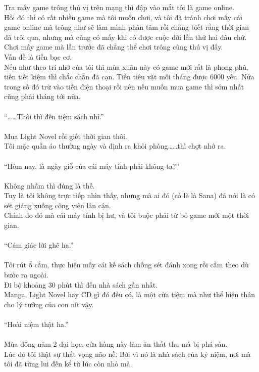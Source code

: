 \documentclass[12pt,a4paper, twosides]{book}
\begin{document}
Tra mấy game trông thú vị trên mạng thì đập vào mắt tôi là game online.\\
Hồi đó thì có rất nhiều game mà tôi muốn chơi, và tôi đã tránh chơi mấy cái game online mà trông như sẽ làm mình phân tâm rồi chẳng biết rằng thời gian đã trôi qua, nhưng mà cũng có mấy khi có được cuộc đời lần thứ hai đâu chứ. Chơi mấy game mà lần trước đã chẳng thể chơi trông cũng thú vị đấy.\\
Vấn đề là tiền bạc cơ.\\
Nếu như theo trí nhớ của tôi thì mùa xuân này có game mới rất là phong phú, tiền tiết kiệm thì chắc chắn đã cạn. Tiền tiêu vặt mỗi tháng được 6000 yên. Nửa trong số đó trừ vào tiền điện thoại rồi nên nếu muốn mua game thì sớm nhất cũng phải tháng tới nữa.\\
\\
“……Thôi thì đến tiệm sách nhỉ.”\\
\\
Mua Light Novel rồi giết thời gian thôi.\\
Tôi mặc quần áo thường ngày và định ra khỏi phòng……thì chợt nhớ ra.\\
\\
“Hôm nay, là ngày giỗ của cái máy tính phải không ta?”\\
\\
Không nhầm thì đúng là thế.\\
Tuy là tôi không trực tiếp nhìn thấy, nhưng mà ai đó (có lẽ là Sana) đã nói là có sét giáng xuống công viên lân cận.\\
Chính do đó mà cái máy tính bị hư, và tôi buộc phải từ bỏ game mới một thời gian.\\
\\
“Cảm giác lời ghê ha.”\\
\\
Tôi rút ổ cắm, thực hiện mấy cái kế sách chống sét đánh xong rồi cầm theo dù bước ra ngoài.\\
Đi bộ khoảng 30 phút thì đến nhà sách gần nhất.\\
Manga, Light Novel hay CD gì đó đều có, là một cửa tiệm mà như thể hiện thân cho lý tưởng của con nít vậy.\\
\\
“Hoài niệm thật ha.”\\
\\
Mùa đông năm 2 đại học, cửa hàng này làm ăn thất thu mà bị phá sản.\\
Lúc đó tôi thật sự thất vọng não nề. Bởi vì nó là nhà sách của kỷ niệm, nơi mà tôi đã từng lui đến kể từ lúc còn nhỏ mà.\\
\end{document}
